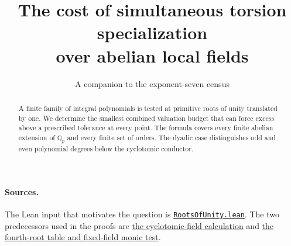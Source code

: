 \documentclass[11pt]{article}
\title{The cost of simultaneous torsion specialization\\over abelian local fields}
\author{A companion to the exponent-seven census}\date{}
\begin{document}
\maketitle
\begin{abstract}
A finite family of integral polynomials is tested at primitive roots of unity translated by one. We determine the smallest combined valuation budget that can force excess above a prescribed tolerance at every point. The formula covers every finite abelian extension of $\mathbb Q_p$ and every finite set of orders. The dyadic case distinguishes odd and even polynomial degrees below the cyclotomic conductor.
\end{abstract}

\paragraph{Sources.} The Lean input that motivates the question is
\href{https://github.com/lsernau/grh-lean/blob/72fead102f663d5c7a407964a13dc0cf9d977207/grh/src/New/Congruences/Selmer/RootsOfUnity.lean}{\texttt{RootsOfUnity.lean}}.
The two predecessors used in the proofs are
\href{https://github.com/VladimirReshetnikov/ProveIt/blob/d31039a48d963692e5a5176f47b6603fc9e9d9cf/docs/incoming/grh-torsion-and-prime-sampling.zip}{the cyclotomic-field calculation}
and \href{https://github.com/VladimirReshetnikov/ProveIt/blob/d31039a48d963692e5a5176f47b6603fc9e9d9cf/docs/incoming/grh_sharp_torsion_and_symplectic_blocks.zip}{the fourth-root table and fixed-field monic test}.
\end{document}
